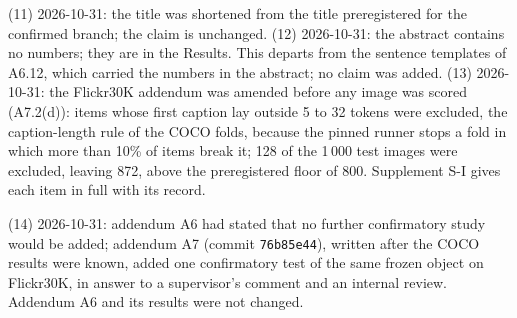 {(11) 2026-10-31: the title was shortened from the title preregistered for the confirmed branch; the claim is unchanged.
(12) 2026-10-31: the abstract contains no numbers; they are in the Results. This departs from the sentence templates of A6.12, which
carried the numbers in the abstract; no claim was added.
(13) 2026-10-31: the Flickr30K addendum was amended before any image was scored (A7.2(d)): items whose first caption lay outside 5 to 32 tokens
were excluded, the caption-length rule of the COCO folds, because the pinned runner stops a fold in which more than 10\% of items break it;
128 of the 1\,000 test images were excluded, leaving 872, above the preregistered floor of 800.
Supplement S-I gives each item in full with its record.\par}
(14) 2026-10-31: addendum A6 had stated that no further confirmatory study would be added; addendum A7 (commit \texttt{76b85e44}), written after the COCO results were known, added one confirmatory test of the same frozen object on Flickr30K, in answer to a supervisor's comment and an internal review. Addendum A6 and its results were not changed.
